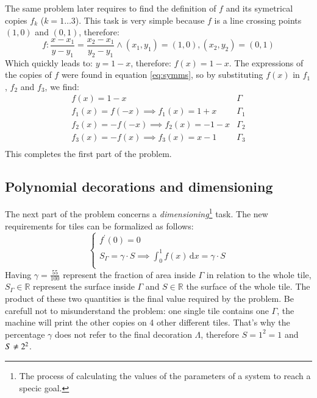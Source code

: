 The same problem later requires to find the definition of $f$ and its symetrical
copies $f_k$ ($k = 1 \dots 3$). This task is very simple because $f$ is a line
crossing points $(1,0)$ and $(0,1)$, therefore:
\begin{equation*}
f: \frac{x-x_1}{y-y_1} = \frac{x_2-x_1}{y_2-y_1} \wedge (x_1,y_1) = (1,0), 
(x_2,y_2) = (0,1)
\end{equation*}
Which quickly leads to: $y = 1-x$, therefore: $f(x) = 1-x$. The expressions of the
copies of $f$ were found in equation \ref{eq:symms}, so by substituting $f(x)$
in $f_1$, $f_2$ and $f_3$, we find:
\begin{equation}\label{eq:exprs}
\begin{array}{l|c}
f(x) = 1 - x & \Gamma \\
f_1(x) = f(-x) \implies f_1(x) = 1 + x & \Gamma_1 \\
f_2(x) = -f(-x) \implies f_2(x) = - 1 - x & \Gamma_2 \\
f_3(x) = -f(x) \implies f_3(x) = x - 1 & \Gamma_3 \\
\end{array}
\end{equation}
This completes the first part of the problem.

\subsection{Polynomial decorations and dimensioning}
\label{sec:c1p1}

The next part of the problem concerns a \emph{dimensioning}\footnote{The
process of calculating the values of the parameters of a system
to reach a specic goal.} task.
The new requirements for tiles can be formalized as follows:
\begin{equation}
\label{eq:fconds2}
\begin{cases}
f^\prime(0) = 0\\
S_{\Gamma} = \gamma \cdot S \implies 
   \int^{1}_{0} f(x) \, \mathrm{d} x = \gamma \cdot S\\
\end{cases}
\end{equation}
Having $\gamma = \frac{55}{100}$ represent the fraction of area inside $\Gamma$
in relation to the whole tile, 
$S_{\Gamma} \in \mathbb{R}$ represent the surface 
inside $\Gamma$ and $S \in \mathbb{R}$ the
surface of the whole tile. The product of these two quantities is the final value 
required by the problem. 
Be carefull not to misunderstand the problem: one single tile contains one $\Gamma$,
the machine will print the other copies on 4 other different tiles. That's why the
percentage $\gamma$ does not refer to the final decoration $\Lambda$, therefore
$S = 1^2 = 1$ and $S \not\eq 2 ^ 2$. 

